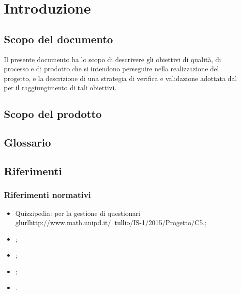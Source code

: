 \documentclass[a4paper, titlepage]{article}
\begin{document}
\newpage
\tableofcontents
\newpage
\listoftables
\label{lastromanpage}

\newpage
\clearpage	
{}

\hypersetup{linkcolor=blue}
\section{Introduzione}
\subsection{Scopo del documento}
Il presente documento ha lo scopo di descrivere gli obiettivi di qualità, di processo e di prodotto che si intendono perseguire nella realizzazione del progetto, e la descrizione di una strategia di verifica e validazione adottata dal  per il raggiungimento di tali obiettivi.

\subsection{Scopo del prodotto}
\SCOPO

\subsection{Glossario}
\GLOSSARIO

\subsection{Riferimenti}
\subsubsection{Riferimenti normativi}
\begin{itemize}
\item {} Quizzipedia:  per la gestione di questionari
\newline \\gl{url}{http://www.math.unipd.it/~tullio/IS-1/2015/Progetto/C5.};
\item {} \NdPdoc;
\item {} \ARdoc;
\item {} \PdPdoc;
\item {} \STdoc.
\end{itemize}
\end{document}
